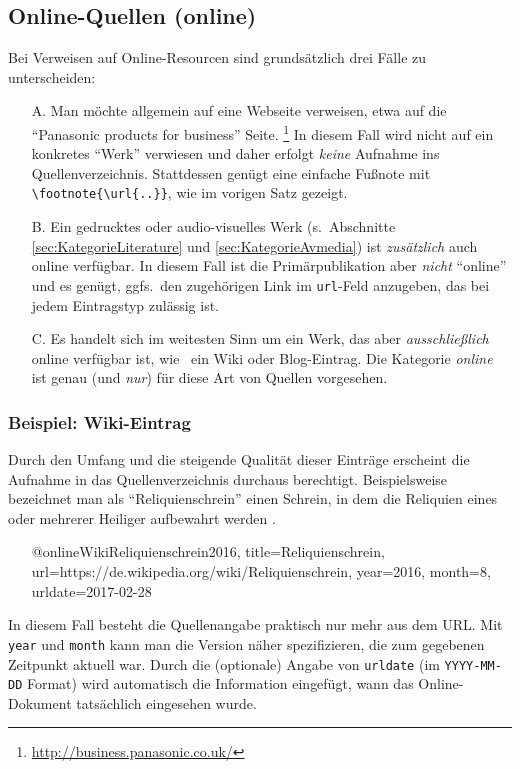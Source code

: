 \subsection{Online-Quellen (\textsf{online})}
\label{sec:KategorieOnline}

Bei Verweisen auf Online-Resourcen sind grundsätzlich drei Fälle zu unterscheiden:
%
\begin{itemize}
\item[A.] Man möchte allgemein auf eine Webseite verweisen, etwa auf die 
	"`Panasonic products for business"' Seite.%
	\footnote{\url{http://business.panasonic.co.uk/}}
	In diesem Fall wird nicht auf ein konkretes "`Werk"' verwiesen und daher
	erfolgt \emph{keine} Aufnahme ins Quellenverzeichnis. Stattdessen
	genügt eine einfache Fußnote mit \verb!\footnote{\url{..}}!, wie im vorigen
	Satz gezeigt.
\item[B.] Ein gedrucktes oder audio-visuelles Werk 
	(s.\ Abschnitte \ref{sec:KategorieLiterature} und \ref{sec:KategorieAvmedia})
	ist \emph{zusätzlich} auch online verfügbar. In diesem Fall ist die Primär\-publikation 
	aber \emph{nicht} "`online"' und es genügt, ggfs.\ den zugehörigen Link im 
	\texttt{url}-Feld anzugeben, das bei jedem Eintragstyp zulässig ist.
\item[C.] Es handelt sich im weitesten Sinn um ein Werk, das aber 
	\emph{ausschließlich} online verfügbar ist, wie \zB\ ein Wiki oder Blog-Eintrag.
	Die Kategorie \emph{online} ist genau (und \emph{nur}) für diese 
	Art von Quellen vorgesehen.
\end{itemize}


\subsubsection{Beispiel: Wiki-Eintrag}
\label{sec:@online-www}
Durch den Umfang und die steigende Qualität dieser Einträge erscheint
die Aufnahme in das Quellenverzeichnis durchaus berechtigt.
Beispielsweise bezeichnet man als "`Reliquienschrein"'
einen Schrein, in dem die Reliquien eines oder 
mehrerer Heiliger aufbewahrt werden \cite{WikiReliquienschrein2016}.
%
\begin{itemize}
\item[]
\begin{GenericCode}[numbers=none]
@online{WikiReliquienschrein2016,
	title={Reliquienschrein},
	url={https://de.wikipedia.org/wiki/Reliquienschrein},
  year={2016},
  month={8},
  urldate={2017-02-28}
}
\end{GenericCode}
\item[\cite{WikiReliquienschrein2016}] 
\end{itemize}
%
In diesem Fall besteht die Quellenangabe praktisch nur mehr aus dem URL.
Mit \texttt{year} und \texttt{month} kann man die Version näher spezifizieren, 
die zum gegebenen Zeitpunkt aktuell war.
Durch die (optionale) Angabe von \texttt{urldate} (im \texttt{YYYY-MM-DD} Format) wird automatisch 
die Information eingefügt, wann das Online-Dokument tatsächlich eingesehen wurde.




